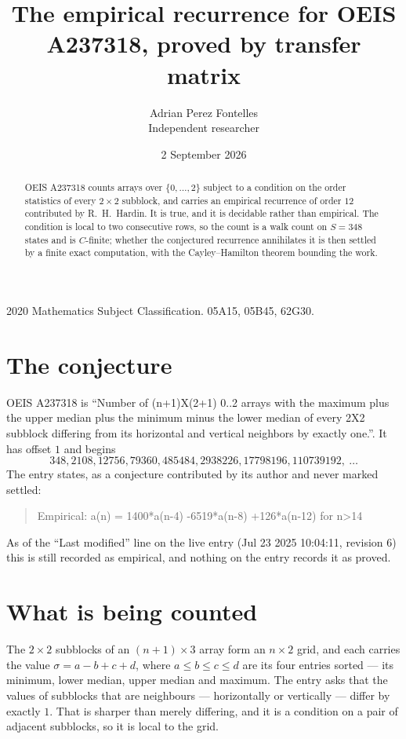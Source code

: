 \documentclass[11pt,a4paper]{article}
\title{The empirical recurrence for OEIS A237318, proved by transfer matrix}
\author{Adrian Perez Fontelles\\ \small Independent researcher}
\date{2 September 2026}
\theoremstyle{plain}
\theoremstyle{definition}
\begin{document}
\maketitle

\begin{abstract}
OEIS A237318 counts arrays over $\{0,\dots,2\}$ subject to a condition on the order
statistics of every $2\times2$ subblock, and carries an empirical recurrence of order
$12$ contributed by R.~H.~Hardin. It is true, and it is decidable rather than empirical.
The condition is local to two consecutive rows, so the count is a walk count on $S=348$
states and is $C$-finite; whether the conjectured recurrence annihilates it is then settled by
a finite exact computation, with the Cayley--Hamilton theorem bounding the work.
\end{abstract}

\noindent\small 2020 Mathematics Subject Classification. 05A15, 05B45, 62G30.\normalsize

\section{The conjecture}

OEIS A237318 is ``Number of (n+1)X(2+1) 0..2 arrays with the maximum plus the upper median plus the minimum minus the lower median of every 2X2 subblock differing from its horizontal and vertical neighbors by exactly one.''. It has offset $1$ and begins
\[
348, 2108, 12756, 79360, 485484, 2938226, 17798196, 110739192,\ \dots
\]
The entry states, as a conjecture contributed by its author and never marked settled:
\begin{quote}
Empirical: a(n) = 1400*a(n-4) -6519*a(n-8) +126*a(n-12) for n>14
\end{quote}
As of the ``Last modified'' line on the live entry (Jul 23 2025 10:04:11, revision 6) this is still
recorded as empirical, and nothing on the entry records it as proved.

\section{What is being counted}

The $2\times2$ subblocks of an $(n+1)\times3$ array form an
$n\times2$ grid, and each carries the value $\sigma=a-b+c+d$, where $a\le b\le c\le d$ are its four entries sorted --- its minimum, lower median, upper median and maximum. The entry asks that the values of
subblocks that are neighbours --- horizontally or vertically --- differ by exactly $1$.
That is sharper than merely differing, and it is a condition on a pair of adjacent subblocks,
so it is local to the grid.
\end{document}
